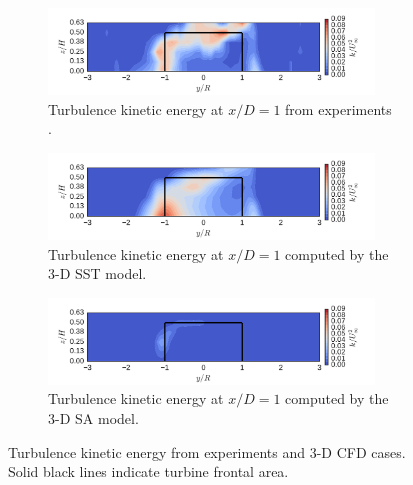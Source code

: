 \documentclass[aip,graphicx]{revtex4-1}
\begin{document}
\begin{figure}
    \centering
    \begin{subfigure}[b]{\textwidth}
        \centering 
        
        \includegraphics[width=0.95\textwidth]{figures/kcont_exp}
        
        \caption{Turbulence kinetic energy at $x/D=1$ from experiments
            \cite{Bachant2015-RVAT-Re-dep-data}.} 
        
        \label{fig:kcont-exp}
    \end{subfigure}
    
    \begin{subfigure}[b]{\textwidth}
        \centering 
        
        \includegraphics[width=0.95\textwidth]{figures/kcont_kOmegaSST}
        
        \caption{Turbulence kinetic energy at $x/D=1$ computed by the 3-D SST
            model.}
        
        \label{fig:kcont-SST}
    \end{subfigure}
    
    \begin{subfigure}[b]{\textwidth}
        \centering 
        
        \includegraphics[width=0.95\textwidth]{figures/kcont_SpalartAllmaras}
        
        \caption{Turbulence kinetic energy at $x/D=1$ computed by the 3-D SA
            model.} 
        
        \label{fig:kcont-SA}
    \end{subfigure}
    
    \caption{Turbulence kinetic energy from experiments and 3-D CFD cases. Solid
        black lines indicate turbine frontal area.}
    
    \label{fig:kcont}
\end{figure}
\end{document}
